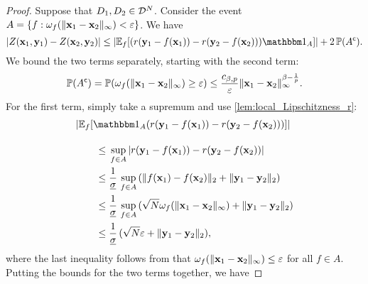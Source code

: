 \documentclass[12pt, twoside]{report}
\begin{document}
\begin{proof}
    Suppose that $D_1, D_2 \in \mathcal{D}^N$.
    Consider the event $A = \{f : 
        \omega_f(\lVert\mathbf{x}_1 - \mathbf{x}_2\rVert_\infty) < \varepsilon
    \}$.
    We have
    \begin{equation}
        \abs{Z(\vx_1, \vy_1) - Z(\vx_2, \vy_2)}
         \le 
            \abs{\E_f[
                (
                    r(\vy_1 - f(\vx_1)) 
                    - r(\vy_2 - f(\vx_2)) 
                ) \ind_A
            ]}
            + 2\, \P(A^\c).
    \end{equation}
    We bound the two terms separately, starting with the second term:
    \begin{equation}
        \P(A^\c)
        =
            \P(\omega_f(\norm{\vx_1 - \vx_2}_\infty) \ge \e)
        \le 
        \frac{c_{\beta, p}}{\e} \norm{\vx_1 - \vx_2}_\infty^{\beta - \frac{1}{p}}.
    \end{equation}
    For the first term, simply take a supremum and use \cref{lem:local_Lipschitzness_r}:
    \begin{align}
        &\abs{\E_f[
            \ind_A
            (
                r(\vy_1 - f(\vx_1)) 
                - r(\vy_2 - f(\vx_2)) 
            ) 
        ]}
        \vphantom{\frac{}{\underline{\sigma}}}
        \nonumber \\
        &\qquad \le 
            \vphantom{\frac{1}{\underline{\sigma}}}
            \sup_{f \in A} \, 
                \abs{
                    r(\vy_1 - f(\vx_1)) 
                    - r(\vy_2 - f(\vx_2)) 
                } \\
        &\qquad \le 
            \frac{1}{\underline{\sigma}}\, \sup_{f \in A} \, 
                (\norm{f(\vx_1) - f(\vx_2)}_2 + \norm{\vy_1 - \vy_2}_2) \\
        &\qquad \le 
            \frac{1}{\underline{\sigma}}\, \sup_{f \in A} \, 
                (\sqrt{N}\omega_f(\norm{\vx_1 - \vx_2}_\infty) + \norm{\vy_1 - \vy_2}_2) \\
        &\qquad \le 
            \frac{1}{\underline{\sigma}}\,
                (\sqrt{N} \e + \norm{\vy_1 - \vy_2}_2),
    \end{align}
    where the last inequality follows from that $\omega_f(\lVert\mathbf{x}_1 - \mathbf{x}_2\rVert_\infty) \le \varepsilon$ for all $f \in A$.
    Putting the bounds for the two terms together, we have

\end{proof}
\end{document}
